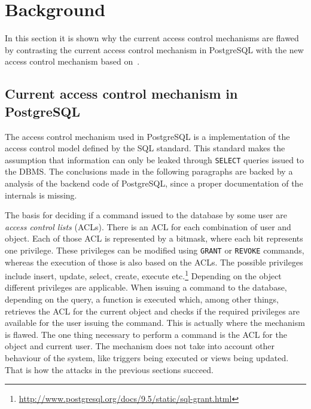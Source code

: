 \section{Background}

In this section it is shown why the current access control mechanisms are flawed by contrasting the current access control mechanism in PostgreSQL with the new access control mechanism based on~\cite{guarnieri2016strong}.
%
\subsection{Current access control mechanism in PostgreSQL}
%
The access control mechanism used in PostgreSQL is a implementation of the access control model defined by the SQL standard.
%
This standard makes the assumption that information can only be leaked through \texttt{SELECT} queries issued to the DBMS.
%
The conclusions made in the following paragraphs are backed by a analysis of the backend code of PostgreSQL, since a proper documentation of the internals is missing.

The basis for deciding if a command issued to the database by some user are \emph{access control lists} (ACLs). 
%
There is an ACL for each combination of user and object.
%
Each of those ACL is represented by a bitmask, where each bit represents one privilege.
%
These privileges can be modified using \texttt{GRANT} or \texttt{REVOKE} commands, whereas the execution of those is also based on the ACLs.
%
The possible privileges include insert, update, select, create, execute etc.\footnote{\url{http://www.postgresql.org/docs/9.5/static/sql-grant.html}}
%
Depending on the object different privileges are applicable.
%
When issuing a command to the database, depending on the query, a function is executed which, among other things, retrieves the ACL for the current object and checks if the required privileges are available for the user issuing the command.
%
This is actually where the mechanism is flawed.
% 
The one thing necessary to perform a command is the ACL for the object and current user.
%
The mechanism does not take into account other behaviour of the system, like triggers being executed or views being updated.
%
That is how the attacks in the previous sections succeed.
%
